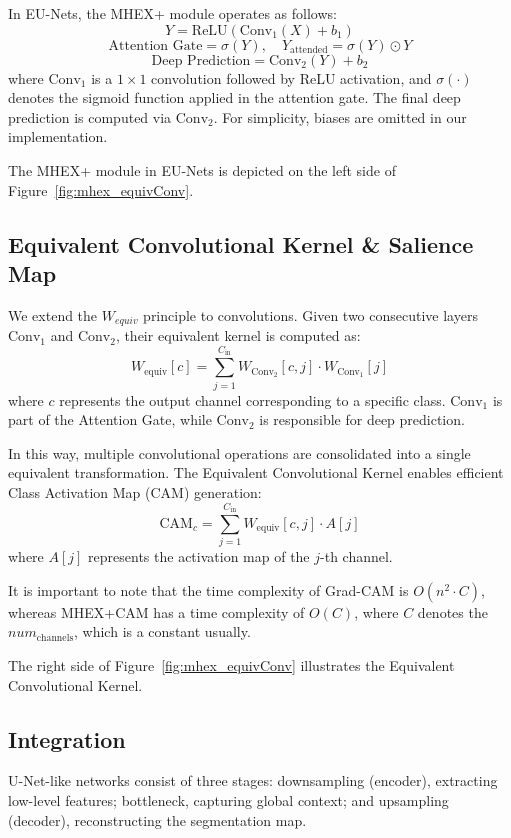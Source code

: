 \documentclass[runningheads]{llncs}
\begin{document}
In EU-Nets, the MHEX+ module operates as follows:
\[
   Y =  \text{ReLU}(\text{Conv}_1(X) + b_1)
\]
\[
   \text{Attention Gate} = \sigma(Y), \quad Y_{\text{attended}} = \sigma(Y) \odot Y
\]
\[
   \text{Deep Prediction} = \text{Conv}_2(Y) + b_2
\]
where \( \text{Conv}_1 \) is a \( 1 \times 1 \) convolution followed by ReLU activation, and \( \sigma(\cdot) \) denotes the sigmoid function applied in the attention gate. The final deep prediction is computed via \( \text{Conv}_2 \). For simplicity, biases are omitted in our implementation.

The MHEX+ module in EU-Nets is depicted on the left side of Figure~\ref{fig:mhex_equivConv}.

\subsection{Equivalent Convolutional Kernel \& Salience Map}
\label{sec:Equivalent Convolutional Kernel}

We extend the \(W_{equiv}\) principle to convolutions. Given two consecutive layers \( \text{Conv}_1 \) and \( \text{Conv}_2 \), their equivalent kernel is computed as:
\[
    W_{\text{equiv}}[c] = \sum_{j=1}^{C_{\text{in}}} W_{\text{Conv}_2}[c, j] \cdot W_{\text{Conv}_1}[j]
\]
where \( c \) represents the output channel corresponding to a specific class. \( \text{Conv}_1 \) is part of the Attention Gate, while \( \text{Conv}_2 \) is responsible for deep prediction.

In this way, multiple convolutional operations are consolidated into a single equivalent transformation. The Equivalent Convolutional Kernel enables efficient Class Activation Map (CAM) generation:
\[
    \text{CAM}_c = \sum_{j=1}^{C_{\text{in}}} W_{\text{equiv}}[c, j] \cdot A[j]
\]
where \( A[j] \) represents the activation map of the \( j \)-th channel.

It is important to note that the time complexity of Grad-CAM is \(O(n^2 \cdot C)\), whereas MHEX+CAM has a time complexity of \(O(C)\), where \(C\) denotes the \(num_\text{channels}\), which is a constant usually.

The right side of Figure~\ref{fig:mhex_equivConv} illustrates the Equivalent Convolutional Kernel.

\subsection{Integration}
\label{sec:Integration}
U-Net-like networks consist of three stages: downsampling (encoder), extracting low-level features; bottleneck, capturing global context; and upsampling (decoder), reconstructing the segmentation map.
\end{document}
